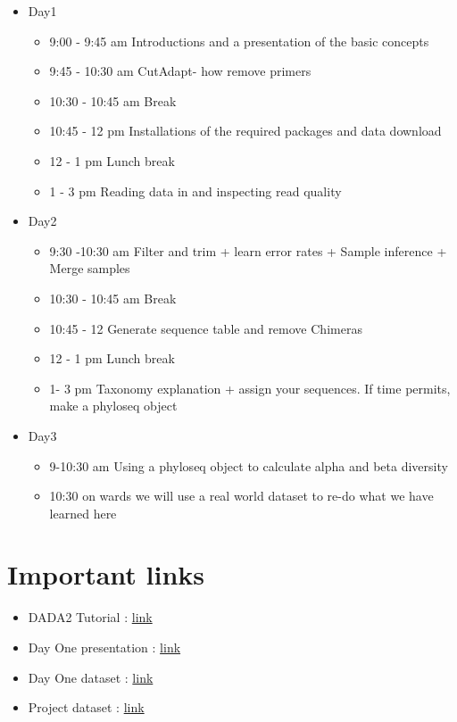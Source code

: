 \documentclass[
]{book}
\providecommand{\tightlist}{%
  \setlength{\itemsep}{0pt}\setlength{\parskip}{0pt}}
\begin{document}
\begin{itemize}
\tightlist
\item
  Day1

  \begin{itemize}
  \tightlist
  \item
    9:00 - 9:45 am Introductions and a presentation of the basic concepts
  \item
    9:45 - 10:30 am CutAdapt- how remove primers
  \item
    10:30 - 10:45 am Break
  \item
    10:45 - 12 pm Installations of the required packages and data download
  \item
    12 - 1 pm Lunch break
  \item
    1 - 3 pm Reading data in and inspecting read quality
  \end{itemize}
\item
  Day2

  \begin{itemize}
  \tightlist
  \item
    9:30 -10:30 am Filter and trim + learn error rates + Sample inference + Merge samples
  \item
    10:30 - 10:45 am Break
  \item
    10:45 - 12 Generate sequence table and remove Chimeras
  \item
    12 - 1 pm Lunch break
  \item
    1- 3 pm Taxonomy explanation + assign your sequences. If time permits, make a phyloseq object
  \end{itemize}
\item
  Day3

  \begin{itemize}
  \tightlist
  \item
    9-10:30 am Using a phyloseq object to calculate alpha and beta diversity
  \item
    10:30 on wards we will use a real world dataset to re-do what we have learned here
  \end{itemize}
\end{itemize}

\hypertarget{important-links}{%
\section{Important links}\label{important-links}}

\begin{itemize}
\tightlist
\item
  DADA2 Tutorial : \href{http://benjjneb.github.io/dada2/tutorial.html}{link}
\item
  Day One presentation : \href{microbiomeworkshop.pdf}{link}
\item
  Day One dataset : \href{MiSeqSOPData.zip}{link}
\item
  Project dataset : \href{https://www.dropbox.com/sh/qra6ohbsyt1icaz/AAACvlNjUhfkbkGIp_1KA2uCa?dl=0}{link}
\end{itemize}
\end{document}
